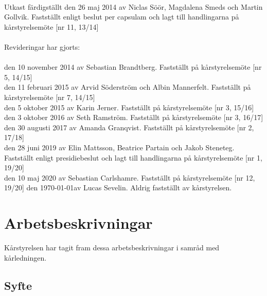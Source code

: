 
\newcommand{\sectionbreak}{\clearpage}


%
%
\vspace*{9 cm}
\noindent
{\huge{}}\\

\vspace{0.2cm}
\noindent
Utkast färdigställt den 26 maj 2014 av Niclas Söör, Magdalena Smeds och
Martin Gollvik. Fastställt enligt beslut per capsulam och lagt till
handlingarna på kårstyrelsemöte {[}nr 11, 13/14{]} \\ \\
Revideringar har gjorts:\\ \\
  den 10 november 2014 av Sebastian Brandtberg. Fastställt på
  kårstyrelsemöte {[}nr 5, 14/15{]} \\
  den 11 februari 2015 av Arvid Söderström och Albin Mannerfelt.
  Fastställt på kårstyrelsemöte {[}nr 7, 14/15{]} \\
  den 5 oktober 2015 av Karin Jerner. Fastställt på kårstyrelsemöte
  {[}nr 3, 15/16{]} \\
  den 3 oktober 2016 av Seth Ramström. Fastställt på kårstyrelsemöte
  {[}nr 3, 16/17{]} \\
  den 30 augusti 2017 av Amanda Granqvist. Fastställt på kårstyrelsemöte
  {[}nr 2, 17/18{]} \\
  den 28 juni 2019 av Elin Mattsson, Beatrice Partain och Jakob
  Steneteg. Fastställt enligt presidiebeslut och lagt till handlingarna
  på kårstyrelsemöte {[}nr 1, 19/20{]} \\
  den 10 maj 2020 av Sebastian Carlshamre. Fastställt på kårstyrelsemöte
  {[}nr 12, 19/20{]}
  den \today av Lucas Sevelin. Aldrig fastställt av kårstyrelsen.

%
%
\vspace*{1 mm}
\tableofcontents

\hypertarget{arbetsbeskrivningar}{%
\section{Arbetsbeskrivningar}\label{arbetsbeskrivningar}}

Kårstyrelsen har tagit fram dessa arbetsbeskrivningar i samråd med
kårledningen.

\hypertarget{syfte}{%
\subsection{Syfte}\label{syfte}}

